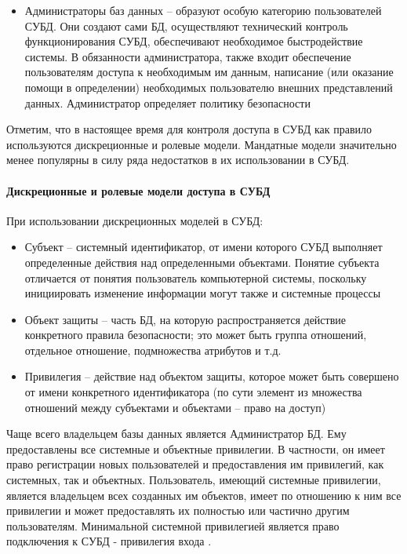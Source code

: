 {\begin{itemize}
    \item Администраторы баз данных -- образуют особую категорию пользователей СУБД. Они создают сами БД, 
    осуществляют технический контроль функционирования СУБД, обеспечивают необходимое быстродействие системы. 
    В обязанности администратора, также входит обеспечение пользователям доступа к необходимым им данным, 
    написание (или оказание помощи в определении) необходимых пользователю внешних представлений данных. 
    Администратор определяет политику безопасности
\end{itemize}

Отметим, что в настоящее время для контроля доступа в СУБД как правило используются дискреционные и ролевые 
модели. Мандатные модели значительно менее популярны в силу ряда недостатков в их использовании в СУБД.

\paragraph{Дискреционные и ролевые модели доступа в СУБД}

При использовании дискреционных моделей в СУБД:
\begin{itemize}
    \item Субъект -- системный идентификатор, от имени которого СУБД выполняет определенные действия над 
    определенными объектами. Понятие субъекта отличается от понятия пользователь компьютерной системы, 
    поскольку инициировать изменение информации могут также и системные процессы
    \item Объект защиты -- часть БД, на которую распространяется действие конкретного правила безопасности; 
    это может быть группа отношений, отдельное отношение, подмножества атрибутов и т.д.
    \item Привилегия -- действие над объектом защиты, которое может быть совершено от имени конкретного 
    идентификатора (по сути элемент из множества отношений между субъектами и объектами -- право на доступ)
\end{itemize}

Чаще всего владельцем базы данных является Администратор БД. Ему предоставлены все системные и объектные 
привилегии. В частности, он имеет право регистрации новых пользователей и предоставления им привилегий, как 
системных, так и объектных. Пользователь, имеющий системные привилегии, является владельцем всех созданных им
объектов, имеет по отношению к ним все привилегии и может предоставлять их полностью или частично другим 
пользователям. Минимальной системной привилегией является право подключения к СУБД - привилегия входа 
\autocite{Skakun}. 

}
